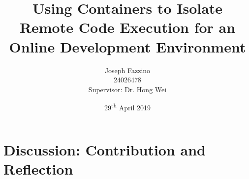 \documentclass[12pt, a4paper]{extreport}
\title{Using Containers to Isolate Remote Code Execution for an Online Development Environment}
\author{
    Joseph Fazzino\\
    24026478\\
    [4cm]{Supervisor: Dr. Hong Wei}
}
\date{29\textsuperscript{th} April 2019}
\begin{document}
\maketitle
\setcounter{tocdepth}{1}
\tableofcontents
\pagebreak



\pagebreak



\pagebreak





% 












\chapter{Discussion: Contribution and Reflection}




\pagebreak


\end{document}
